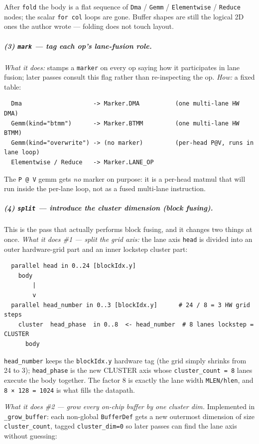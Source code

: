 \documentclass[
  10pt,
]{article}
\begin{document}
After \texttt{fold} the body is a flat sequence of \texttt{Dma} /
\texttt{Gemm} / \texttt{Elementwise} / \texttt{Reduce} nodes; the scalar
\texttt{for col} loops are gone. Buffer shapes are still the logical 2D
ones the author wrote --- folding does not touch layout.

\subparagraph{(3) \texttt{mark} --- tag each op's lane-fusion
role.}\label{fa-mark} \emph{What it does:} stamps a \texttt{marker} on
every op saying how it participates in lane fusion; later passes consult
this flag rather than re-inspecting the op. \emph{How:} a fixed table:

\begin{verbatim}
  Dma                    -> Marker.DMA          (one multi-lane HW DMA)
  Gemm(kind="btmm")      -> Marker.BTMM         (one multi-lane HW BTMM)
  Gemm(kind="overwrite") -> (no marker)         (per-head P@V, runs in lane loop)
  Elementwise / Reduce   -> Marker.LANE_OP
\end{verbatim}

The \texttt{P\,@\,V} gemm gets \emph{no} marker on purpose: it is a
per-head matmul that will run inside the per-lane loop, not as a fused
multi-lane instruction.

\subparagraph{(4) \texttt{split} --- introduce the cluster dimension
(block fusing).}\label{fa-split} This is the pass that actually performs
block fusing, and it changes two things at once. \emph{What it does
\#1 --- split the grid axis:} the lane axis \texttt{head} is divided into
an outer hardware-grid part and an inner lockstep cluster part:

\begin{verbatim}
  parallel head in 0..24 [blockIdx.y]
    body
        |
        v
  parallel head_number in 0..3 [blockIdx.y]      # 24 / 8 = 3 HW grid steps
    cluster  head_phase  in 0..8  <- head_number  # 8 lanes lockstep = CLUSTER
      body
\end{verbatim}

\texttt{head\_number} keeps the \texttt{blockIdx.y} hardware tag (the
grid simply shrinks from 24 to 3); \texttt{head\_phase} is the new
CLUSTER axis whose \texttt{cluster\_count = 8} lanes execute the body
together. The factor 8 is exactly the lane width \texttt{MLEN/hlen}, and
\texttt{8 × 128 = 1024} is what fills the datapath.

\emph{What it does \#2 --- grow every on-chip buffer by one cluster
dim.} Implemented in \texttt{\_grow\_buffer}: each non-global
\texttt{BufferDef} gets a new outermost dimension of size
\texttt{cluster\_count}, tagged \texttt{cluster\_dim=0} so later passes
can find the lane axis without guessing:
\end{document}
